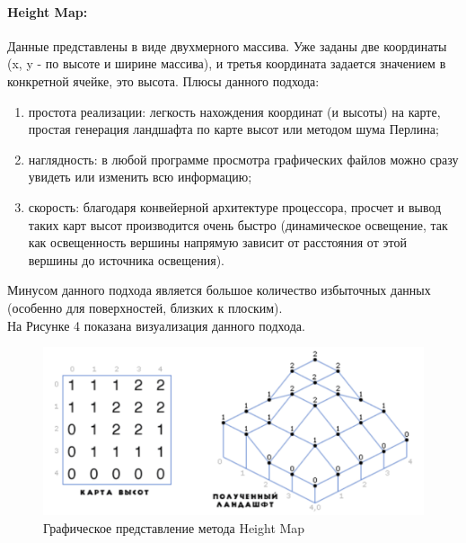 \documentclass[a4paper, 10pt]{article}
\begin{document}
	\paragraph{Height Map:}
	 Данные представлены в виде двухмерного массива. Уже заданы две координаты (x, y - по высоте и ширине массива), и третья координата задается значением в конкретной ячейке, это высота.
	\clearpage
	\newpage
	Плюсы данного подхода:
	\begin{enumerate}
		\item простота реализации: легкость нахождения координат (и высоты) на карте, простая генерация ландшафта по карте высот или методом шума Перлина;
		\item наглядность: в любой программе просмотра графических файлов можно сразу увидеть или изменить всю информацию;
		\item скорость: благодаря конвейерной архитектуре процессора, просчет и вывод таких карт высот производится очень быстро (динамическое освещение, так как освещенность вершины напрямую зависит от расстояния от этой вершины до источника освещения).
	\end{enumerate}
	\hspace*{5mm} Минусом данного подхода является большое количество избыточных данных (особенно для поверхностей, близких к плоским).
	\\На Рисунке 4 показана визуализация данного подхода.
	\begin{figure}[h!]
		\centering
		\includegraphics[scale=0.7]{heightmap}
		\centering\caption{Графическое представление метода Height Map}
	\end{figure}
\end{document}
